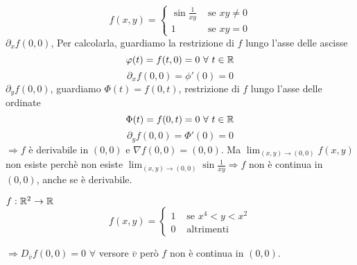 \begin{exbar}
\begin{example}
	\begin{equation*}
		f(x,y)=\begin{cases}
			\sin\frac{1}{xy}&\text{  se  }xy\neq0\\
			1& \text{  se  }xy=0
		\end{cases}
	\end{equation*}
	$\partial_{x}f(0,0)$, Per calcolarla, guardiamo la restrizione di $f$ lungo l'asse delle ascisse\\
	\begin{equation*}
		\varphi(t)=f(t,0)=0\,\,\forall\,\,t\in\mathbb{R}
	\end{equation*}
	\begin{equation*}
		\partial_xf(0,0)=\phi'(0)=0
	\end{equation*}
	$\partial_yf(0,0)$, guardiamo $\Phi(t)=f(0,t)$, restrizione di $f$ lungo l'asse delle ordinate
	\begin{equation*}
		\Phi(t)=f(0,t)=0\,\,\forall\,\, t \in \mathbb{R}
	\end{equation*}
	\begin{equation*}
		\partial_yf(0,0)=\Phi'(0)=0
	\end{equation*}
	$\Rightarrow f$ è derivabile in $(0,0)$ e $\nabla f(0,0)=(0,0)$. Ma $\lim_{(x,y)\rightarrow(0,0)}f(x,y)$ non esiste perchè non esiste $\lim_{(x,y)\rightarrow(0,0)}\sin\frac{1}{xy}\Rightarrow f$ non è continua in $(0,0)$, anche se è derivabile.  
\end{example}
\end{exbar}


\begin{exbar}
	{$f:\mathbb{R}^2\rightarrow\mathbb{R}$
		\begin{equation*}
			f(x,y)=\begin{cases}
				1&\text{  se  }x^4<y<x^2\\
				0 &\text{  altrimenti}
			\end{cases}
		\end{equation*}

		\segnaposto %
		
		$\Rightarrow D_{\overline{v}}f(0,0)=0\,\,\forall$ versore $\overline{v}$ però $f$ non è continua in $(0,0)$.}
\end{exbar}

\begin{comment}	





	


	
	
	
	
	
	
	
	
\end{comment}